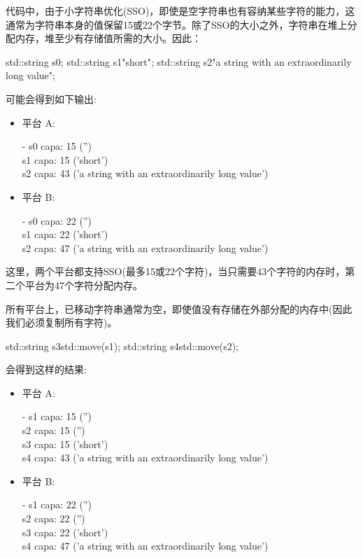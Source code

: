 代码中，由于小字符串优化(SSO)，即使是空字符串也有容纳某些字符的能力，这通常为字符串本身的值保留15或22个字节。除了SSO的大小之外，字符串在堆上分配内存，堆至少有存储值所需的大小。因此：\par

\begin{codebox}[cpp]
std::string s0;
std::string s1{"short"};
std::string s2{"a string with an extraordinarily long value"};
\end{codebox}

可能会得到如下输出:\par

\begin{itemize}
  \item 平台 A:
  \begin{myOutput}
  - s0 capa: 15 ('') \\
  s1 capa: 15 ('short') \\
  s2 capa: 43 ('a string with an extraordinarily long value')
  \end{myOutput}
  \item 平台 B:
  \begin{myOutput}
  - s0 capa: 22 ('') \\
  s1 capa: 22 ('short') \\
  s2 capa: 47 ('a string with an extraordinarily long value')
  \end{myOutput}
\end{itemize}

这里，两个平台都支持SSO(最多15或22个字符)，当只需要43个字符的内存时，第二个平台为47个字符分配内存。\par

所有平台上，已移动字符串通常为空，即使值没有存储在外部分配的内存中(因此我们必须复制所有字符)。\par

\begin{codebox}[cpp]
std::string s3{std::move(s1)};
std::string s4{std::move(s2)};
\end{codebox}

会得到这样的结果:\par

\begin{itemize}
  \item 平台 A:
  \begin{myOutput}
  - s1 capa: 15 ('') \\
  s2 capa: 15 ('') \\
  s3 capa: 15 ('short') \\
  s4 capa: 43 ('a string with an extraordinarily long value')
  \end{myOutput}
  \item 平台 B:
  \begin{myOutput}
  - s1 capa: 22 ('') \\
  s2 capa: 22 ('') \\
  s3 capa: 22 ('short') \\
  s4 capa: 47 ('a string with an extraordinarily long value')
  \end{myOutput}
\end{itemize}

